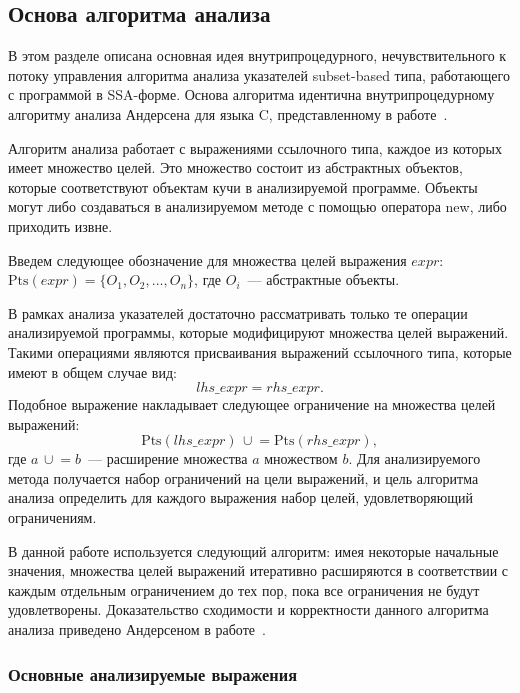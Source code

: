 \documentclass[14pt,titlepage]{extarticle}
\newcommand{\Pts}[1]{\textrm{Pts}(#1)}
\newcommand{\cupe}{\,\cup\!\!=}
\newcommand{\eng}[1]{{\English#1}}
\begin{document}
    \subsection{Основа алгоритма анализа}
      \label{section:algorithm_basis}

      В этом разделе описана основная идея внутрипроцедурного,
      нечувствительного к потоку управления алгоритма анализа указателей
      \eng{subset-based} типа, работающего с программой в SSA-форме. Основа
      алгоритма идентична внутрипроцедурному алгоритму анализа Андерсена для
      языка C, представленному в работе~\cite{andersen}.

      Алгоритм анализа работает с выражениями ссылочного типа, каждое из
      которых имеет множество целей. Это множество состоит из абстрактных
      объектов, которые соответствуют объектам кучи в анализируемой программе.
      Объекты могут либо создаваться в анализируемом методе с помощью оператора
      \eng{new}, либо приходить извне.

      Введем следующее обозначение для множества целей выражения $expr$:
      $\Pts{expr} = \{O_1, O_2, \ldots, O_n\}$, где $O_i$~--- абстрактные
      объекты.

      В рамках анализа указателей достаточно рассматривать только те операции
      анализируемой программы, которые модифицируют множества целей выражений.
      Такими операциями являются присваивания выражений ссылочного типа,
      которые имеют в общем случае вид:
      \[lhs\_expr = rhs\_expr.\]
      Подобное выражение накладывает следующее ограничение на множества целей
      выражений:
      \[\Pts{lhs\_expr} \cupe \Pts{rhs\_expr},\]
      где $a \cupe b$~--- расширение множества $a$ множеством $b$.
      Для анализируемого метода получается набор ограничений на цели выражений,
      и цель алгоритма анализа определить для каждого выражения набор целей,
      удовлетворяющий ограничениям.

      В данной работе используется следующий алгоритм: имея некоторые
      начальные значения, множества целей выражений итеративно расширяются в
      соответствии с каждым отдельным ограничением до тех пор, пока все
      ограничения не будут удовлетворены. Доказательство сходимости и
      корректности данного алгоритма анализа приведено Андерсеном в
      работе~\cite{andersen}.

      \subsubsection{Основные анализируемые выражения}
        \label{section:pts_providers}
\end{document}
